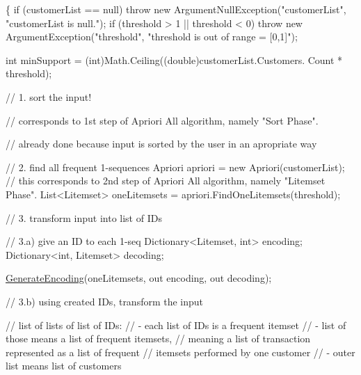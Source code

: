 \begin{DoxyCode}
                                                                               
                 \{
            \textcolor{keywordflow}{if} (customerList == null)
                \textcolor{keywordflow}{throw} \textcolor{keyword}{new} ArgumentNullException(\textcolor{stringliteral}{"customerList"}, \textcolor{stringliteral}{"customerList
       is null."});
            \textcolor{keywordflow}{if} (threshold > 1 || threshold < 0)
                \textcolor{keywordflow}{throw} \textcolor{keyword}{new} ArgumentException(\textcolor{stringliteral}{"threshold"}, \textcolor{stringliteral}{"threshold is out of
       range = [0,1]"});

            \textcolor{keywordtype}{int} minSupport = (int)Math.Ceiling((\textcolor{keywordtype}{double})customerList.Customers.
      Count * threshold);

            \textcolor{comment}{// 1. sort the input!}

            \textcolor{comment}{// corresponds to 1st step of Apriori All algorithm, namely "Sort
       Phase".}

            \textcolor{comment}{// already done because input is sorted by the user in an
       apropriate way}

            \textcolor{comment}{// 2. find all frequent 1-sequences}
            Apriori apriori = \textcolor{keyword}{new} Apriori(customerList);
            \textcolor{comment}{// this corresponds to 2nd step of Apriori All algorithm, namely
       "Litemset Phase".}
            List<Litemset> oneLitemsets = apriori.FindOneLitemsets(threshold);

            \textcolor{comment}{// 3. transform input into list of IDs}

            \textcolor{comment}{// 3.a) give an ID to each 1-seq}
            Dictionary<Litemset, int> encoding;
            Dictionary<int, Litemset> decoding;

            \hyperlink{class_apriori_all_lib_1_1_apriori_all_algorithm_afc5e40088ea694ce9de76cd8f4d34900}{GenerateEncoding}(oneLitemsets, out encoding, out 
      decoding);

            \textcolor{comment}{// 3.b) using created IDs, transform the input}

            \textcolor{comment}{// list of lists of list of IDs:}
            \textcolor{comment}{// - each list of IDs is a frequent itemset}
            \textcolor{comment}{// - list of those means a list of frequent itemsets, }
            \textcolor{comment}{//   meaning a list of transaction represented as a list of
       frequent }
            \textcolor{comment}{//   itemsets performed by one customer}
            \textcolor{comment}{// - outer list means list of customers}


\end{DoxyCode}
